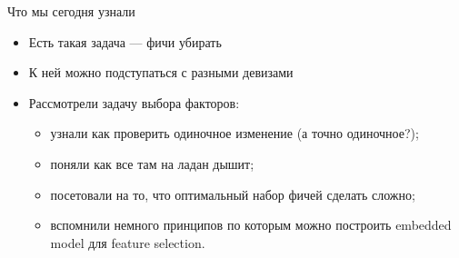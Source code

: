 \documentclass[14pt, fleqn, xcolor={dvipsnames, table}]{beamer}
\begin{document}
\begin{frame}{Что мы сегодня узнали}
\begin{itemize}
  \item Есть такая задача --- фичи убирать
  \item К ней можно подступаться с разными девизами
  \item Рассмотрели задачу выбора факторов:
  \begin{itemize}
    \item узнали как проверить одиночное изменение (а точно одиночное?);
    \item поняли как все там на ладан дышит;
    \item посетовали на то, что оптимальный набор фичей сделать сложно;
    \item вспомнили немного принципов по которым можно построить embedded model для feature selection.
  \end{itemize}
\end{itemize}
\end{frame}
\end{document}
